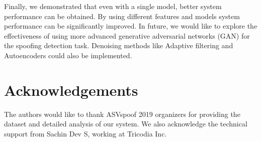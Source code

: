 \documentclass[a4paper]{article}
\begin{document}
   Finally, we demonstrated that even with a single model, better system performance can be obtained. By using different features and models system performance can be significantly improved. In future, we would like to explore the effectiveness of using more advanced generative adversarial networks (GAN) for the spoofing detection task. Denoising methods like Adaptive filtering and Autoencoders could also be implemented.  

\section{Acknowledgements}
    The authors would like to thank ASVspoof 2019 organizers for providing the dataset and detailed analysis of our system. We also acknowledge the technical support from Sachin Dev S, working at Tricodia Inc.



\end{document}
